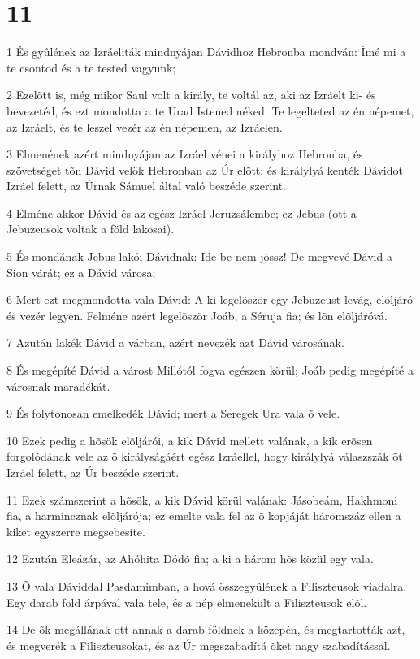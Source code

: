 \chapter{11}

\par 1 És gyûlének az Izráeliták mindnyájan Dávidhoz Hebronba mondván:  Ímé mi a te csontod és a te tested vagyunk;
\par 2 Ezelõtt is, még mikor Saul volt a király, te voltál az, aki az Izráelt ki- és bevezetéd, és ezt mondotta a te Urad Istened néked: Te legelteted az én népemet, az Izráelt, és te leszel vezér az én népemen, az Izráelen.
\par 3 Elmenének azért mindnyájan az Izráel vénei a királyhoz Hebronba, és szövetséget tõn Dávid velök Hebronban az Úr elõtt; és királylyá kenték Dávidot Izráel felett, az Úrnak Sámuel által való beszéde szerint.
\par 4 Elméne akkor Dávid és az egész Izráel Jeruzsálembe; ez Jebus (ott a Jebuzeusok voltak a föld lakosai).
\par 5 És mondának Jebus lakói Dávidnak: Ide be nem jössz! De megvevé Dávid a Sion várát; ez a Dávid városa;
\par 6 Mert ezt megmondotta vala Dávid: A ki legelõször egy Jebuzeust levág, elõljáró és vezér legyen. Felméne azért legelõször Joáb, a Séruja fia; és lõn elõljáróvá.
\par 7 Azután lakék Dávid a várban, azért nevezék azt Dávid városának.
\par 8 És megépíté Dávid a várost Millótól fogva egészen körül; Joáb pedig megépíté a városnak maradékát.
\par 9 És folytonosan emelkedék Dávid; mert a Seregek Ura vala õ vele.
\par 10 Ezek pedig a hõsök elõljárói, a kik Dávid mellett valának, a kik erõsen forgolódának vele az õ királyságáért egész Izráellel, hogy királylyá válaszszák õt Izráel felett, az Úr beszéde szerint.
\par 11 Ezek számszerint a hõsök, a kik Dávid körül valának: Jásobeám, Hakhmoni fia, a harmincznak elõljárója; ez emelte vala fel az õ kopjáját háromszáz ellen  a kiket egyszerre megsebesíte.
\par 12 Ezután Eleázár, az Ahóhita Dódó fia; a ki a három hõs közül egy vala.
\par 13 Õ vala Dáviddal Pasdamimban, a hová összegyûlének a Filiszteusok viadalra. Egy darab föld árpával vala tele, és a nép elmenekült a Filiszteusok elõl.
\par 14 De õk megállának ott annak a darab földnek a közepén, és megtartották azt, és megverék a Filiszteusokat, és az Úr megszabadítá õket nagy szabadítással.
